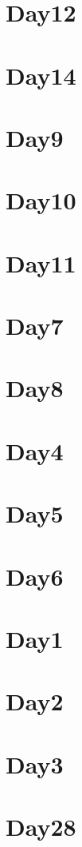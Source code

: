 
\section*{Day12}

\vfill
\section*{Day14}

\vfill
\section*{Day9}

\vfill
\section*{Day10}

\vfill
\section*{Day11}

\vfill
\section*{Day7}

\vfill
\section*{Day8}

\vfill
\section*{Day4}

\vfill
\section*{Day5}

\vfill
\section*{Day6}

\vfill
\section*{Day1}

\vfill
\section*{Day2}

\vfill
\section*{Day3}

\vfill
\section*{Day28}

\vfill
